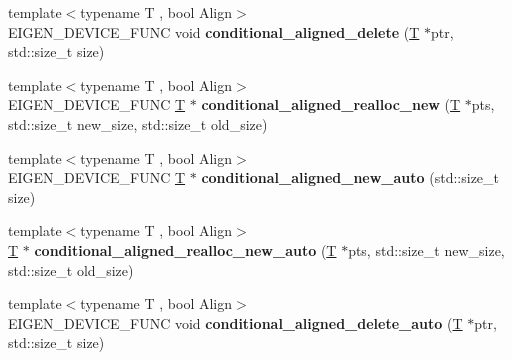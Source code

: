 \begin{DoxyCompactItemize}
\item 
\mbox{\label{namespace_eigen_1_1internal_a3b0a6d8544622794c1a91c7d5ecc0462}} 
{\footnotesize template$<$typename T , bool Align$>$ }\\E\+I\+G\+E\+N\+\_\+\+D\+E\+V\+I\+C\+E\+\_\+\+F\+U\+NC void {\bfseries conditional\+\_\+aligned\+\_\+delete} (\hyperlink{group___sparse_core___module}{T} $\ast$ptr, std\+::size\+\_\+t size)
\item 
\mbox{\label{namespace_eigen_1_1internal_aff2e184825a824997558362829777c81}} 
{\footnotesize template$<$typename T , bool Align$>$ }\\E\+I\+G\+E\+N\+\_\+\+D\+E\+V\+I\+C\+E\+\_\+\+F\+U\+NC \hyperlink{group___sparse_core___module}{T} $\ast$ {\bfseries conditional\+\_\+aligned\+\_\+realloc\+\_\+new} (\hyperlink{group___sparse_core___module}{T} $\ast$pts, std\+::size\+\_\+t new\+\_\+size, std\+::size\+\_\+t old\+\_\+size)
\item 
\mbox{\label{namespace_eigen_1_1internal_a0bbef5f3b9ae8fe336e74269cdd1c6b7}} 
{\footnotesize template$<$typename T , bool Align$>$ }\\E\+I\+G\+E\+N\+\_\+\+D\+E\+V\+I\+C\+E\+\_\+\+F\+U\+NC \hyperlink{group___sparse_core___module}{T} $\ast$ {\bfseries conditional\+\_\+aligned\+\_\+new\+\_\+auto} (std\+::size\+\_\+t size)
\item 
\mbox{\label{namespace_eigen_1_1internal_a7cca48785c34346aa5a31b905dbab610}} 
{\footnotesize template$<$typename T , bool Align$>$ }\\\hyperlink{group___sparse_core___module}{T} $\ast$ {\bfseries conditional\+\_\+aligned\+\_\+realloc\+\_\+new\+\_\+auto} (\hyperlink{group___sparse_core___module}{T} $\ast$pts, std\+::size\+\_\+t new\+\_\+size, std\+::size\+\_\+t old\+\_\+size)
\item 
\mbox{\label{namespace_eigen_1_1internal_a4e30a9533494470d75c772223faa9903}} 
{\footnotesize template$<$typename T , bool Align$>$ }\\E\+I\+G\+E\+N\+\_\+\+D\+E\+V\+I\+C\+E\+\_\+\+F\+U\+NC void {\bfseries conditional\+\_\+aligned\+\_\+delete\+\_\+auto} (\hyperlink{group___sparse_core___module}{T} $\ast$ptr, std\+::size\+\_\+t size)
\item 

\end{DoxyCompactItemize}
